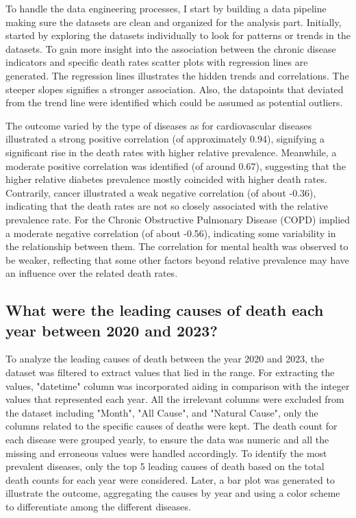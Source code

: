 \documentclass[a4paper,10pt]{article}
\begin{document}
To handle the data engineering processes, I start by building a data pipeline making sure the datasets are clean and organized for the analysis part. Initially, started by exploring the datasets individually to look for patterns or trends in the datasets. To gain more insight into the association between the chronic disease indicators and specific death rates  scatter plots with regression lines are generated. The regression lines illustrates the hidden trends and correlations. The steeper slopes signifies a stronger association. Also, the datapoints that deviated from the trend line were identified which could be assumed as potential outliers.

The outcome varied by the type of diseases as for cardiovascular diseases illustrated a strong positive correlation (of approximately 0.94), signifying a significant rise in the death rates with higher relative prevalence. Meanwhile, a moderate positive correlation was identified (of around 0.67), suggesting that the higher relative diabetes prevalence mostly coincided with higher death rates.  Contrarily, cancer illustrated a weak negative correlation (of about -0.36), indicating that the death rates are not so closely associated with the relative prevalence rate. For the Chronic Obstructive Pulmonary Disease (COPD) implied a moderate negative correlation (of about -0.56), indicating some variability in the relationship between them. The correlation for mental health was observed to be weaker, reflecting that some other factors beyond relative prevalence may have an influence over the related death rates.

\subsection{What were the leading causes of death each year between 2020 and 2023?}

To analyze the leading causes of death between the year 2020 and 2023, the dataset was filtered to extract values that lied in the range. For extracting the values, "datetime" column was incorporated aiding in comparison with the integer values that represented each year. All the irrelevant columns were excluded from the dataset including "Month", "All Cause", and "Natural Cause", only the columns related to the specific causes of deaths were kept. The death count for each disease were grouped yearly, to ensure the data was numeric and all the missing and erroneous values were handled accordingly. To identify the most prevalent diseases, only the top 5 leading causes of death based on the total death counts for each year were considered. Later, a bar plot was generated to illustrate the outcome, aggregating the causes by year and using a color scheme to differentiate among the different diseases.
\end{document}
